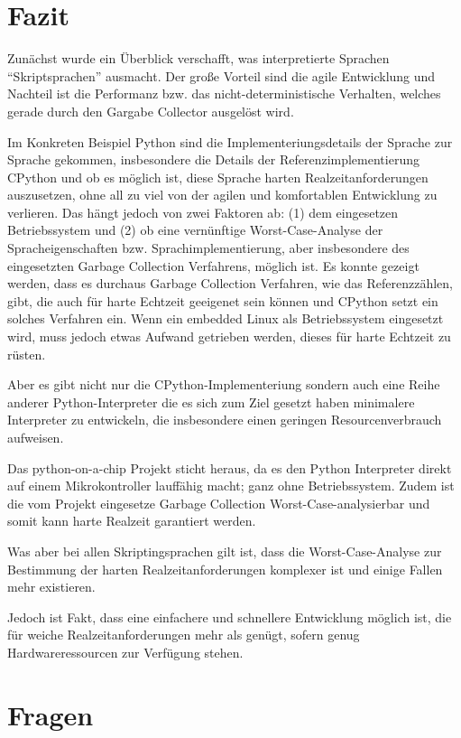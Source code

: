 \section{Fazit}


Zunächst wurde ein Überblick verschafft, was interpretierte Sprachen
“Skriptsprachen” ausmacht. Der große Vorteil sind die agile Entwicklung und
Nachteil ist die Performanz bzw. das nicht-deterministische Verhalten, welches
gerade durch den Gargabe Collector ausgelöst wird.

Im Konkreten Beispiel Python sind die Implementeriungsdetails der Sprache zur
Sprache gekommen, insbesondere die Details der Referenzimplementierung CPython
und ob es möglich ist, diese Sprache harten Realzeitanforderungen auszusetzen,
ohne all zu viel von der agilen und komfortablen Entwicklung zu verlieren.
Das hängt jedoch von zwei Faktoren ab: (1) dem eingesetzen Betriebssystem und (2) ob
eine vernünftige Worst-Case-Analyse der Spracheigenschaften bzw.
Sprachimplementierung, aber insbesondere des eingesetzten Garbage Collection
Verfahrens, möglich ist. Es konnte gezeigt werden, dass es durchaus Garbage Collection
Verfahren, wie das Referenzzählen, gibt, die auch für harte Echtzeit geeigenet
sein können und CPython setzt ein solches Verfahren ein. Wenn ein embedded Linux als
Betriebssystem eingesetzt wird, muss jedoch etwas Aufwand getrieben werden,
dieses für harte Echtzeit zu rüsten.

Aber es gibt nicht nur die CPython-Implementeriung sondern auch eine Reihe
anderer Python-Interpreter die es sich zum Ziel gesetzt haben minimalere
Interpreter zu entwickeln, die insbesondere einen geringen Resourcenverbrauch
aufweisen.

Das python-on-a-chip Projekt sticht heraus, da es den Python Interpreter
direkt auf einem Mikrokontroller lauffähig macht; ganz ohne Betriebssystem.
Zudem ist die vom Projekt eingesetze Garbage Collection
Worst-Case-analysierbar und somit kann harte Realzeit garantiert werden.

Was aber bei allen Skriptingsprachen gilt ist, dass die Worst-Case-Analyse
zur Bestimmung der harten Realzeitanforderungen komplexer ist und einige
Fallen mehr existieren.

Jedoch ist Fakt, dass eine einfachere und schnellere Entwicklung möglich ist,
die für weiche Realzeitanforderungen mehr als genügt, sofern genug
Hardware\-ressourcen zur Verfügung stehen.


\newpage
\section{Fragen}


